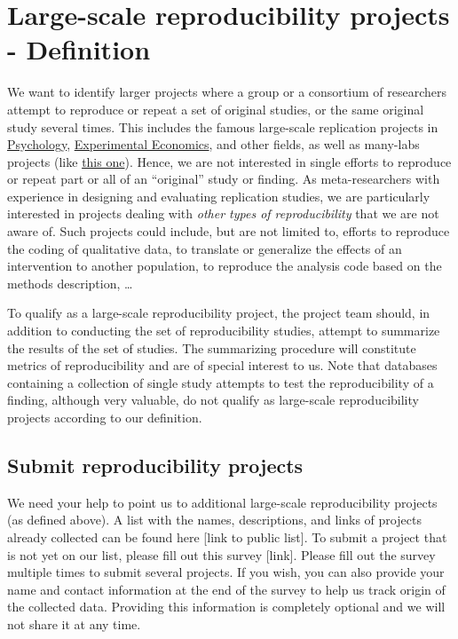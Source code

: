 \documentclass[a4paper,10.5pt]{report}
\begin{document}
\section*{Large-scale reproducibility projects - Definition}
We want to identify larger projects where a group or a consortium of researchers attempt to reproduce or repeat a set of original studies, or the same original study several times. This includes the famous large-scale replication projects in \href{https://doi.org/10.1126/science.aac4716}{Psychology}, \href{https://www.science.org/doi/10.1126/science.aaf0918}{Experimental Economics}, and other fields, as well as many-labs projects (like \href{https://osf.io/wx7ck/}{this one}). Hence, we are not interested in single efforts to reproduce or repeat part or all of an ``original'' study or finding. As meta-researchers with experience in designing and evaluating replication studies, we are particularly interested in projects dealing with \textit{other types of reproducibility} that we are not aware of. Such projects could include, but are not limited to, efforts to reproduce the coding of qualitative data, to translate or generalize the effects of an intervention to another population, to reproduce the analysis code based on the methods description, \dots

To qualify as a large-scale reproducibility project, the project team should, in addition to conducting the set of reproducibility studies, attempt to summarize the results of the set of studies. The summarizing procedure will constitute metrics of reproducibility and are of special interest to us. Note that databases containing a collection of single study attempts to test the reproducibility of a finding, although very valuable, do not qualify as large-scale reproducibility projects according to our definition.

\subsection*{Submit reproducibility projects}
We need your help to point us to additional large-scale reproducibility projects (as defined above). A list with the names, descriptions, and links of projects already collected can be found here [link to public list].
To submit a project that is not yet on our list, please fill out this survey [link]. Please fill out the survey multiple times to submit several projects. If you wish, you can also provide your name and contact information at the end of the survey to help us track origin of the collected data. Providing this information is completely optional and we will not share it at any time.
\end{document}
